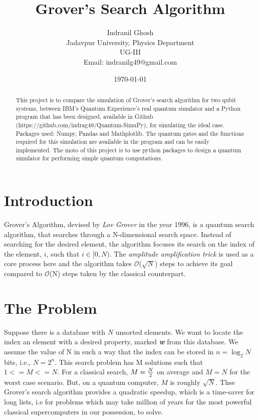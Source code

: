 \documentclass{article}
\title{\textbf{Grover's Search Algorithm}}
\author{Indranil Ghosh\\Jadavpur University, Physics Department\\ UG-III\\ Email: indranilg49@gmail.com}
\date{\today}
\begin{document}
\maketitle

\begin{abstract}
This project is to compare the simulation of Grover's search algorithm for two qubit systems, between IBM's Quantum Experience's real quantum simulator and a  Python program that  has been designed, available in Github (https://github.com/indrag49/Quantum-SimuPy), for  simulating the ideal case. Packages used: Numpy, Pandas and Mathplotlib. The quantum gates and the functions required for this simulation are available in the program and can be easily implemented. The moto of this project is to use python packages to design a quantum simulator for performing simple quantum computations.
\end{abstract}

\section{Introduction}
Grover's Algorithm, devised by \textit{Lov Grover} in the year 1996, is a quantum search algorithm, that searches through a N-dimensional search space. Instead of searching for the desired element, the algorithm focuses its search on the index of the element, $i$, such that $i \in[0, N)$. The \textit{amplitude amplification trick} is used as a core process here and the algorithm takes $\mathcal{O}$($\sqrt{N}$) steps to achieve its goal compared to  $\mathcal{O}$(N) steps taken by the classical counterpart.

\section{The Problem}
Suppose there is a database with $N$ unsorted elements. We want to locate the index an element with a desired property, marked \textit{\textbf{w}} from this database. We assume the value of N in such a way that the index can be stored in $n=\log_2{N}$ bits, i.e., $N=2^n$. This search problem has M solutions such that $1<=M<=N$. For a classical search, $M={N \over 2}$ on average and $M=N$ for the worst case scenario. But, on a quantum computer, $M$ is roughly $\sqrt{N}$. Thse Grover's search algorithm provides a quadratic speedup, which is  a time-saver for long lists, i.e for problems which may take million of years for the most powerful classical supercomputers in our possession, to solve.
\end{document}
